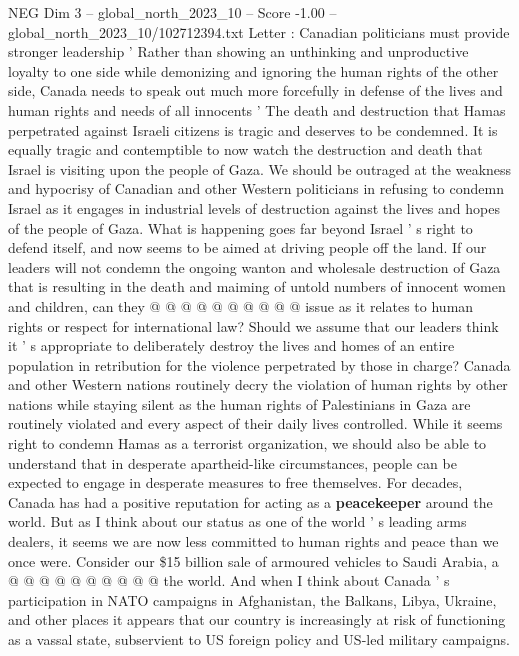 \begin{textsample}{NEG Dim 3 – global\_north\_2023\_10 – Score -1.00 – global\_north\_2023\_10/102712394.txt}  \label{ex:f3_neg_184}
Letter : Canadian politicians must provide stronger leadership ' Rather than showing an unthinking and unproductive loyalty to one side while demonizing and ignoring the human rights of the other side, Canada needs to speak out much more forcefully in defense of the lives and human rights and needs of all innocents ' The death and destruction that Hamas perpetrated against Israeli citizens is tragic and deserves to be condemned.
It is equally tragic and contemptible to now watch the destruction and death that Israel is visiting upon the people of Gaza.
We should be outraged at the weakness and hypocrisy of Canadian and other Western politicians in refusing to condemn Israel as it engages in industrial levels of destruction against the lives and hopes of the people of Gaza.
What is happening goes far beyond Israel ' s right to defend itself, and now seems to be aimed at driving people off the land.
If our leaders will not condemn the ongoing wanton and wholesale destruction of Gaza that is resulting in the death and maiming of untold numbers of innocent women and children, can they @ @ @ @ @ @ @ @ @ @ issue as it relates to human rights or respect for international law?
Should we assume that our leaders think it ' s appropriate to deliberately destroy the lives and homes of an entire population in retribution for the violence perpetrated by those in charge?
Canada and other Western nations routinely decry the violation of human rights by other nations while staying silent as the human rights of Palestinians in Gaza are routinely violated and every aspect of their daily lives controlled.
While it seems right to condemn Hamas as a terrorist organization, we should also be able to understand that in desperate apartheid-like circumstances, people can be expected to engage in desperate measures to free themselves.
For decades, Canada has had a positive reputation for acting as a \textbf{peacekeeper} around the world.
But as I think about our status as one of the world ' s leading arms dealers, it seems we are now less committed to human rights and peace than we once were.
Consider our \$15 billion sale of armoured vehicles to Saudi Arabia, a @ @ @ @ @ @ @ @ @ @ the world.
And when I think about Canada ' s participation in NATO campaigns in Afghanistan, the Balkans, Libya, Ukraine, and other places it appears that our country is increasingly at risk of functioning as a vassal state, subservient to US foreign policy and US-led military campaigns.

\end{textsample}
